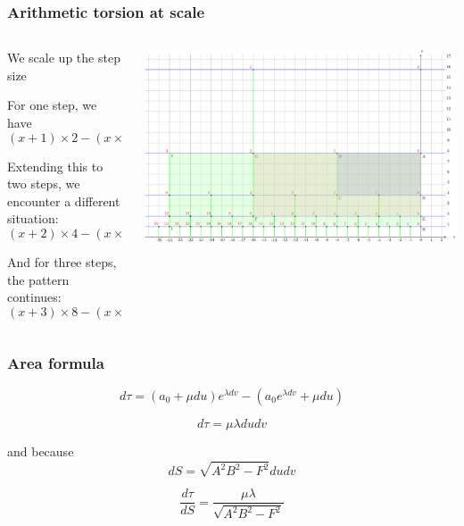 \documentclass[aspectratio=169]{beamer}
\begin{document}
\begin{frame}
    \frametitle{Arithmetic torsion at scale}
    \begin{columns}
        \begin{column}{0.5\textwidth}
            We scale up the step size

            For one step, we have
            \begin{equation}
            (x + 1) \times 2 - (x \times 2 + 1) = 1
            \end{equation}

            Extending this to two steps, we encounter a different situation:
            \begin{equation}
            (x + 2) \times 4 - (x \times 4 + 2) = 6
            \end{equation}

            And for three steps, the pattern continues:
            \begin{equation}
            (x + 3) \times 8 - (x \times 8 + 3) = 21
            \end{equation}
        \end{column}
        \begin{column}{0.5\textwidth}
            \begin{center}
                \includegraphics[width=1.0\textwidth]{../images/17-area-formula}
            \end{center}
        \end{column}
    \end{columns}
\end{frame}

\begin{frame}
    \frametitle{Area formula}
    \[
        d\tau = (a_0 + \mu du) e^{\lambda dv} - (a_0 e^{\lambda dv} + \mu du)
    \]

    \[
        d\tau = \mu \lambda du dv
    \]

    and because
    \[
        dS = \sqrt{A^2B^2 - F^2} du dv
    \]

    \begin{equation}
        \frac{d\tau}{dS} = \frac{\mu \lambda}{\sqrt{A^2B^2 - F^2}}
    \end{equation}
\end{frame}
\end{document}

